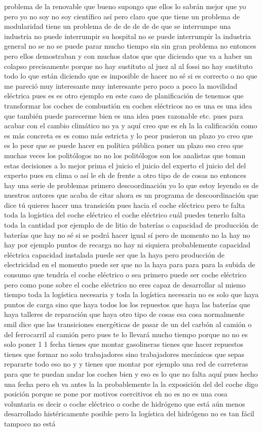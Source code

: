 problema de la renovable que bueno supongo que ellos lo sabrán mejor que yo pero yo no soy no soy científico así pero claro que que tiene un problema de modularidad tiene un problema de de de de de de que se interrumpe una industria no puede interrumpir su hospital no se puede interrumpir la industria general no se no se puede parar mucho tiempo sin sin gran problema no entonces pero ellos demostraban y con muchos datos que que diciendo que va a haber un colapso precisamente porque no hay sustituto al juez al al fossi no hay sustituto todo lo que están diciendo que es imposible de hacer no sé si es correcto o no que me pareció muy interesante muy interesante pero poco a poco la movilidad eléctrica pues es es otro ejemplo en este caso de planificación de tenemos que transformar los coches de combustión en coches eléctricos no es una es una idea que también puede parecerme bien es una idea pues razonable etc. pues para acabar con el cambio climático no ya y aquí creo que es eh la la calificación como es más concreta es es como más estricta y lo peor pusieron un plazo yo creo que es lo peor que se puede hacer en política pública poner un plazo eso creo que muchas veces los politólogos no no los politólogos son los analistas que toman estas decisiones a lo mejor prima el juicio el juicio del experto el juicio del del experto pues en clima o así le eh de frente a otro tipo de de cosas no entonces hay una serie de problemas primero descoordinación yo lo que estoy leyendo es de nuestros autores que acaba de citar ahora es un programa de descoordinación que dice tú quieres hacer una transición pues hacia el coche eléctrico pero te falta toda la logística del coche eléctrico el coche eléctrico cuál puedes tenerlo falta toda la cantidad por ejemplo de de litio de baterías o capacidad de producción de baterías que hay no sé si se podrá hacer igual sí pero de momento no la hay no hay por ejemplo puntos de recarga no hay ni siquiera probablemente capacidad eléctrica capacidad instalada puede ser que la haya pero producción de electricidad en el momento puede ser que no la haya para para para la subida de consumo que tendría el coche eléctrico o sea primero puede ser coche eléctrico pero como pone sobre el coche eléctrico no eres capaz de desarrollar al mismo tiempo toda la logística necesaria y toda la logística necesaria no es solo que haya puntos de carga sino que haya todos los los repuestos que haya las baterías que haya talleres de reparación que haya otro tipo de cosas esa cosa normalmente smil dice que las transiciones energéticas de pasar de un del carbón al camión o del ferrocarril al camión pero pues te lo llevará mucho tiempo porque no no es solo poner 1 1 fecha tienes que montar gasolineras tienes que hacer repuestos tienes que formar no solo trabajadores sino trabajadores mecánicos que sepas repararte todo eso no y y tienes que montar por ejemplo una red de carreteras para que te puedan andar los coches bien y eso es lo que no falta aquí pues hecho una fecha pero eh va antes la la probablemente la la exposición del del coche digo posición porque se pone por motivos coercitivos eh no es no es una cosa voluntaria es decir o coche eléctrico o coche de hidrógeno que está aún menos desarrollado histéricamente posible pero la logística del hidrógeno no es tan fácil tampoco no está 